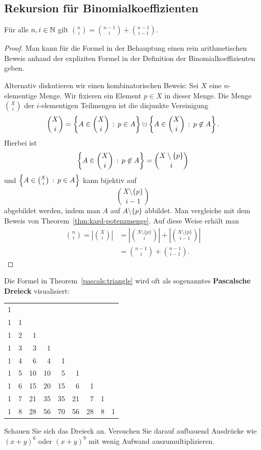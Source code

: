 \subsection{Rekursion für Binomialkoeffizienten} 

\begin{thm} \label{pascals:triangle} 
	Für alle $n,i \in \mathbb{N}$ gilt $\binom{n}{i}  = \binom{n-1}{i}  + \binom{n-1}{i-1}$. 
\end{thm} 
\begin{proof} 
	Man kann für die Formel in der Behauptung einen rein arithmetischen Beweis anhand der expliziten Formel in der Definition der Binomialkoeffizienten geben. 
	
	Alternativ diskutieren wir einen kombinatorischen Beweis: Sei $X$ eine $n$-elementige Menge. Wir fixieren ein Element $p\in X$ in dieser Menge. Die Menge $\binom{X}{i}$ der $i$-elementigen Teilmengen ist die disjunkte Vereinigung 
	\[
		\binom{X}{i} = \setcond{ A \in \binom{X}{i}}{p \in A} \cupdot \setcond{A \in \binom{X}{i}}{p \not\in A}. 
	\]
	Hierbei ist 
	\[
			\left\{ A \in \binom{X}{i} \,:\, p \not\in A \right\} = \binom{X \setminus \{p\}}{i}
	\]
	und $\left\{  A \in \binom{X}{i} \,:\, p \in A \right\}$ kann bijektiv auf 
	\[
			\binom{X \setminus \{p\}}{i-1}
	\]
	abgebildet werden, indem man $A$ auf $A \setminus \{p\}$ abbildet. Man vergleiche mit dem Beweis von Theorem~\ref{thm:kard-potenzmenge}.
	Auf diese Weise erhält man 
	\begin{align*}
		\binom{n}{i} = \left| \binom{X}{i} \right| & = \left| \binom{X \setminus \{p\}}{i} \right| + \left| \binom{X \setminus \{p\}}{i-1}\right| 
		\\ & = \binom{n-1}{i} + \binom{n-1}{i-1}. 
	\end{align*} 
\end{proof} 


\begin{aufg}
	Die Formel in Theorem~\ref{pascals:triangle} wird oft als sogenanntes \textbf{Pascalsche Dreieck} visualisiert:
	\begin{center}
	\begin{tabular}{rrrrrrrrr}
1\\
1 & 1\\
1 & 2 & 1\\
1 & 3 & 3 & 1\\
1 & 4 & 6 & 4 & 1\\
1 & 5 & 10 & 10 & 5 & 1\\
1 & 6 & 15 & 20 & 15 & 6 & 1\\
1 & 7 & 21 & 35 & 35 & 21 & 7 & 1\\
1 & 8 & 28 & 56 & 70 & 56 & 28 & 8 & 1
	\end{tabular}
\end{center}
Schauen Sie sich das Dreieck an. Versuchen Sie darauf aufbauend Ausdrücke wie $(x+y)^6$ oder $(x+y)^9$ mit wenig Aufwand auszumultiplizieren.
\end{aufg} 


